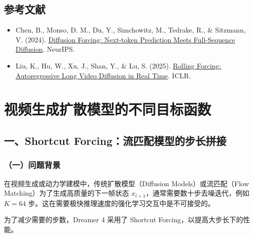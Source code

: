 \hypertarget{ux53c2ux8003ux6587ux732e-142}{%
\subsection{参考文献}\label{ux53c2ux8003ux6587ux732e-142}}

\vspace{0.25em}
\begin{itemize}
\tightlist
\item
  Chen, B., Monso, D. M., Du, Y., Simchowitz, M., Tedrake, R., \& Sitzmann, V. (2024). \href{https://arxiv.org/abs/2407.01392}{Diffusion Forcing: Next-token Prediction Meets Full-Sequence Diffusion}. NeurIPS.
\item
  Liu, K., Hu, W., Xu, J., Shan, Y., \& Lu, S. (2025). \href{https://arxiv.org/abs/2509.25161}{Rolling Forcing: Autoregressive Long Video Diffusion in Real Time}. ICLR.
\end{itemize}

\clearpage

\hypertarget{ux89c6ux9891ux751fux6210ux6269ux6563ux6a21ux578bux7684ux4e0dux540cux76eeux6807ux51fdux6570}{%
\section{视频生成扩散模型的不同目标函数}\label{ux89c6ux9891ux751fux6210ux6269ux6563ux6a21ux578bux7684ux4e0dux540cux76eeux6807ux51fdux6570}}

\hypertarget{ux4e00shortcut-forcingux6d41ux5339ux914dux6a21ux578bux7684ux6b65ux957fux62fcux63a5}{%
\subsection{一、Shortcut Forcing：流匹配模型的步长拼接}\label{ux4e00shortcut-forcingux6d41ux5339ux914dux6a21ux578bux7684ux6b65ux957fux62fcux63a5}}

\hypertarget{ux4e00ux95eeux9898ux80ccux666f-3}{%
\subsubsection{（一）问题背景}\label{ux4e00ux95eeux9898ux80ccux666f-3}}

在视频生成或动力学建模中，传统扩散模型（Diffusion Models）或流匹配（Flow Matching）为了生成高质量的下一帧状态 \(x_{t+1}\)，通常需要数十步去噪迭代，例如 \(K=64\) 步。这在需要极快推理速度的强化学习交互中是不可接受的。

为了减少需要的步数，Dreamer 4 采用了 Shortcut Forcing，以提高大步长下的性能。

